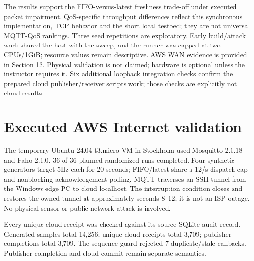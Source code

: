 \documentclass[11pt,a4paper]{article}
\begin{document}
The results support the FIFO-versus-latest freshness trade-off under executed packet impairment. QoS-specific throughput differences reflect this synchronous implementation, TCP behavior and the short local testbed; they are not universal MQTT-QoS rankings. Three seed repetitions are exploratory. Early build/attack work shared the host with the sweep, and the runner was capped at two CPUs/1GiB; resource values remain descriptive. AWS WAN evidence is provided in Section 13. Physical validation is not claimed; hardware is optional unless the instructor requires it. Six additional loopback integration checks confirm the prepared cloud publisher/receiver scripts work; those checks are explicitly not cloud results.


\section{Executed AWS Internet validation}

The temporary Ubuntu 24.04 t3.micro VM in Stockholm used Mosquitto 2.0.18 and Paho 2.1.0. 36 of 36 planned randomized runs completed. Four synthetic generators target 5Hz each for 20 seconds; FIFO/latest share a 12/s dispatch cap and nonblocking acknowledgement polling. MQTT traverses an SSH tunnel from the Windows edge PC to cloud localhost. The interruption condition closes and restores the owned tunnel at approximately seconds 8--12; it is not an ISP outage. No physical sensor or public-network attack is involved.


Every unique cloud receipt was checked against its source SQLite audit record. Generated samples total 14,256; unique cloud receipts total 3,709; publisher completions total 3,709. The sequence guard rejected 7 duplicate/stale callbacks. Publisher completion and cloud commit remain separate semantics.
\end{document}
